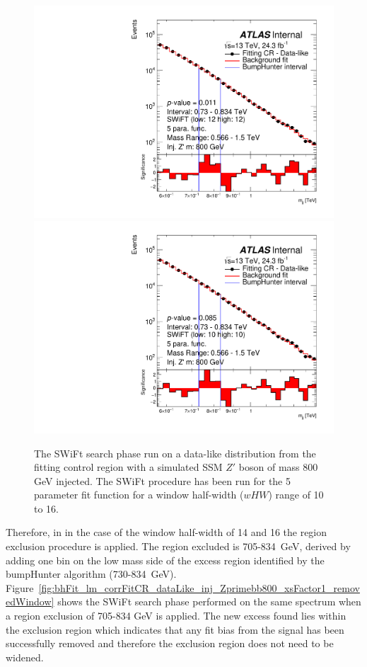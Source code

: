 \begin{figure}[!htb]
{  \includegraphics[width=0.45\linewidth, angle=0]{figs/Dibjet/LowMass/FitStudy_min566/bhFit_corrFitCR_dataLike_5para_low12_high12_inj_Zprimebb800_xsFactor1.pdf}
}
 {
  \includegraphics[width=0.45\linewidth, angle=0]{figs/Dibjet/LowMass/FitStudy_min566/bhFit_corrFitCR_dataLike_5para_low10_high10_inj_Zprimebb800_xsFactor1.pdf}
}

\caption{\label{fig:bhFit_lm_corrFitCR_dataLike_inj_Zprimebb800_xsFactor1}
  The SWiFt search phase run on a data-like distribution
  from the fitting control region with a simulated SSM $Z'$ boson of mass 800 GeV injected.
  The SWiFt procedure has been run for the 5 parameter fit function for a window half-width ($wHW$) range of 10 to 16.
}
\end{figure}

Therefore, in in the case of the window half-width of 14 and 16 the region exclusion procedure is applied.
The region excluded is 705-834~GeV, derived by adding one bin on the low mass side of the excess region identified by the bumpHunter algorithm (730-834~GeV).
Figure~\ref{fig:bhFit_lm_corrFitCR_dataLike_inj_Zprimebb800_xsFactor1_removedWindow} shows the SWiFt search phase
performed on the same spectrum when a region exclusion of 705-834 GeV is applied.
The new excess found lies within the exclusion region which indicates that any fit bias from the signal has been successfully removed
and therefore the exclusion region does not need to be widened.


